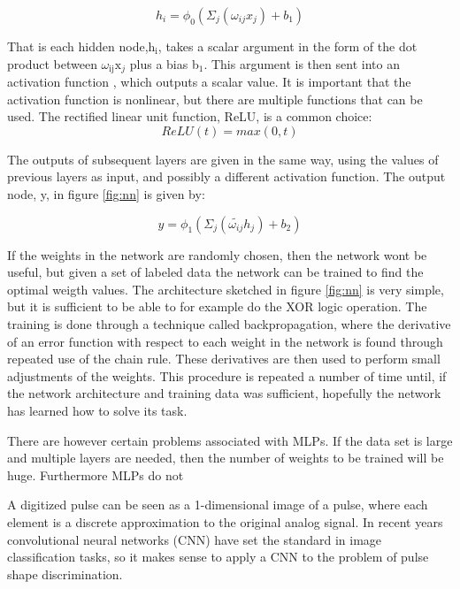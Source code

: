 \documentclass[main.tex]{subfiles}
\begin{document}
\begin{equation}
	h_i = \phi_0\left(\Sigma_j \left( \omega_{ij}x_j \right) + b_1\right)
\end{equation}

That is each hidden node,h$_\textrm{i}$,  takes a scalar argument in the form of the dot product between $\omega_\textrm{ij}\textrm{x}_{j}$ plus a bias b$_\textrm{1}$. This argument is then sent into an activation function \textphi, which outputs a scalar value. It is important that the activation function is nonlinear, but there are multiple functions that can be used. The rectified linear unit function, ReLU, is a common choice:
\begin{equation}
	ReLU(t) = max(0,t)
	\label{ReLU}
\end{equation}

The outputs of subsequent layers are given in the same way, using the values of previous layers as input, and possibly a different activation function. The output node, y, in figure \ref{fig:nn} is given by:

\begin{equation}
	y = \phi_1\left(\Sigma_j \left( \tilde{\omega_{ij}}h_j \right) + b_2\right)
\end{equation}

If the weights in the network are randomly chosen, then the network wont be useful, but given a set of labeled data the network can be trained to find the optimal weigth values. The architecture sketched in figure \ref{fig:nn} is very simple, but it is sufficient to be able to for example do the XOR logic operation. The training is done through a technique called backpropagation, where the derivative of an error function with respect to each weight in the network is found through repeated use of the chain rule. These derivatives are then used to perform small adjustments of the weights. This procedure is repeated a number of time until, if the network architecture and training data was sufficient, hopefully the network has learned how to solve its task.

There are however certain problems associated with MLPs. If the data set is large and multiple layers are needed, then the number of weights to be trained will be huge. Furthermore MLPs do not 

A digitized pulse can be seen as a 1-dimensional image of a pulse, where each element is a discrete approximation to the original analog signal. In recent years convolutional neural networks (CNN) have set the standard in image classification tasks, so it makes sense to apply a CNN to the problem of pulse shape discrimination.  
\end{document}

